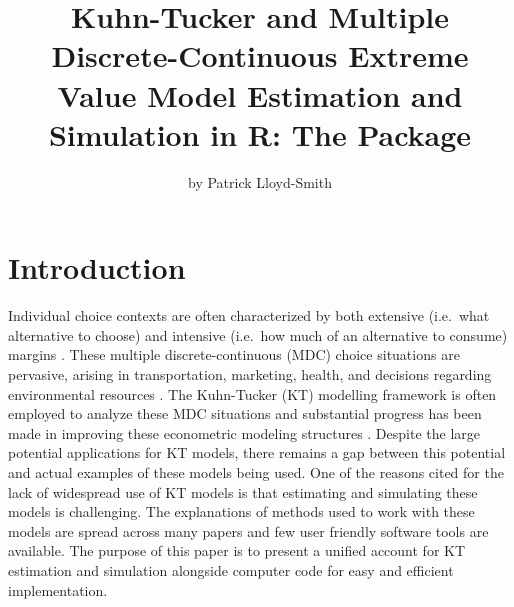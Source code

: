 \title{Kuhn-Tucker and Multiple Discrete-Continuous Extreme Value Model
Estimation and Simulation in R: The  Package}
\author{by Patrick Lloyd-Smith}

\maketitle


\hypertarget{introduction}{%
\section{Introduction}\label{introduction}}

Individual choice contexts are often characterized by both extensive
(i.e.~what alternative to choose) and intensive (i.e.~how much of an
alternative to consume) margins \citep{bhatmultiple2008}. These multiple
discrete-continuous (MDC) choice situations are pervasive, arising in
transportation, marketing, health, and decisions regarding environmental
resources \citep{bhatmultiple2014}. The Kuhn-Tucker (KT) modelling
framework is often employed to analyze these MDC situations and
substantial progress has been made in improving these econometric
modeling structures \citep{vonhaefenkuhn-tucker2005, bhatmultiple2014}.
Despite the large potential applications for KT models, there remains a
gap between this potential and actual examples of these models being
used. One of the reasons cited for the lack of widespread use of KT
models is that estimating and simulating these models is challenging.
The explanations of methods used to work with these models are spread
across many papers and few user friendly software tools are available.
The purpose of this paper is to present a unified account for KT
estimation and simulation alongside computer code for easy and efficient
implementation.

